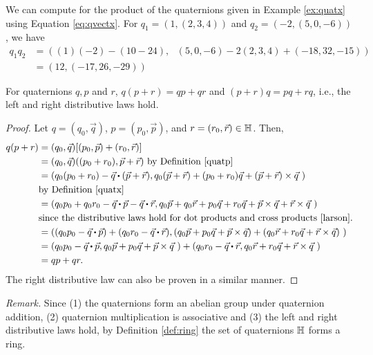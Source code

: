 \begin{ex}
	We can compute for the product of the quaternions given in Example \ref{ex:quatx} using Equation \ref{eq:qvectx}. For $q_1 = (1,(2,3,4))$ and $q_2 = (-2,(5,0,-6))$, we have
	\begin{align*}
		q_1 q_2 &= ((1)(-2)-(10-24),\text{ }(5,0,-6)-2(2,3,4)+(-18,32,-15)) \\
		&= (12,(-17,26,-29))
	\end{align*}
\end{ex}

\begin{theorem} \label{theorem:distquat}
	For quaternions $q, p$ and $r$, $q(p+r) = qp+qr$ and $(p+r)q = pq + rq$, i.e., the left and right distributive laws hold.
\end{theorem}

\begin{proof}
	Let $q = (q_0,\vec{q})$, $p = (p_0,\vec{p})$, and $r = (r_0,\vec{r}) \in \operatorname{\mathbb{H}}$. Then,
	\begin{align*}
		q(p+r) &= (q_0,\vec{q})[(p_0,\vec{p})+(r_0,\vec{r})] \\
			   &= (q_0,\vec{q})((p_0+r_0),\vec{p}+\vec{r}) \text{ by Definition \ref{quatp}} \\
			   &= (q_0(p_0+r_0)-\vec{q}\bigcdot(\vec{p}+\vec{r}), q_0(\vec{p}+\vec{r})+(p_0+r_0)\vec{q}+(\vec{p}+\vec{r})\times\vec{q}\text{ })\\
			   &\text{by Definition \ref{quatx}} \\
			   &= (q_0p_0+q_0r_0-\vec{q}\bigcdot\vec{p}-\vec{q}\bigcdot\vec{r}, q_0\vec{p} + q_0\vec{r} + p_0\vec{q}+ r_0\vec{q} + \vec{p}\times\vec{q} + \vec{r}\times\vec{q}\text{ }) \\
			   &\text{since the distributive laws hold for dot products and cross products \cite{larson}.}\\
			   &= ((q_0p_0-\vec{q}\bigcdot\vec{p})+(q_0r_0-\vec{q}\bigcdot\vec{r}), (q_0\vec{p}+ p_0\vec{q}+ \vec{p}\times\vec{q}) + (q_0\vec{r} + r_0\vec{q} + \vec{r}\times\vec{q})\text{ }) \\
			   &=(q_0p_0-\vec{q}\bigcdot\vec{p},q_0\vec{p}+ p_0\vec{q}+ \vec{p}\times\vec{q}\text{ }) + (q_0r_0-\vec{q}\bigcdot\vec{r},q_0\vec{r} + r_0\vec{q} + \vec{r}\times\vec{q}\text{ }) \\
			   &=qp + qr.
	\end{align*}
	The right distributive law can also be proven in a similar manner.
\end{proof}
\newline
\newline
\textit{Remark.} Since (1) the quaternions form an abelian group under quaternion addition, (2) quaternion multiplication is associative and (3) the left and right distributive laws hold, by Definition \ref{def:ring} the set of quaternions $\operatorname{\mathbb{H}}$ forms a ring.

